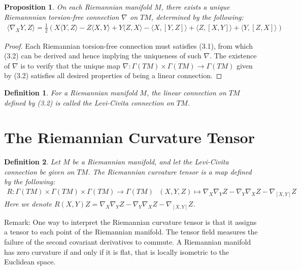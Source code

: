\documentclass[11pt]{book}
\theoremstyle{break}
\theoremstyle{break}
\newtheorem{prop}[lem]{Proposition}
\newtheorem{defn}{Definition}[corL]
\newcommand{\remark}{\color{blue}Remark: \color{black}}
\begin{document}
\begin{prop}
On each Riemannian manifold $M$, there exists a unique Riemannnian torsion-free connection $\nabla$ on $TM$, determined by the following:
\begin{align}
\langle \nabla_X Y,Z \rangle = \frac{1}{2}\left( X\langle Y,Z\rangle - Z\langle X,Y\rangle + Y \langle Z, X\rangle - \langle X,[Y,Z]\rangle + \langle Z, [X,Y]\rangle + \langle Y, [Z,X]\rangle\right)
\end{align}
\end{prop}
\begin{proof}
Each Riemannian torsion-free connection must satisfies (3.1), from which  (3.2) can be derived and hence implying the uniqueness of such $\nabla$. The existence of $\nabla$ is to verify that the unique map $\nabla:\Gamma(TM) \times \Gamma(TM) \to \Gamma(TM)$ given by (3.2) satisfies all desired properties of being a linear connection.
\end{proof}

\begin{defn}
For a Riemannian manifold $M$, the linear connection on $TM$ defined by (3.2) is called the Levi-Civita connection on $TM$. 
\end{defn}


\newpage
\section[The Riemannian Curvature Tensor]{\color{red} The Riemannian Curvature Tensor\color{black}}
\begin{defn}
Let $M$ be a Riemannian manifold, and let the Levi-Civita connection be given on $TM$. The Riemannian curvature tensor is a map defined by the following:
\begin{align*}
R:\Gamma(TM) \times \Gamma(TM) \times \Gamma(TM) \to \Gamma(TM) \ \ \ (X,Y,Z) \mapsto \nabla_X\nabla_Y Z - \nabla_Y\nabla_X Z - \nabla_{[X,Y]}Z
\end{align*}
Here we denote $R(X,Y)Z = \nabla_X\nabla_Y Z - \nabla_Y\nabla_X Z - \nabla_{[X,Y]}Z$. 
\end{defn}

\remark One way to interpret the Riemannian curvature tensor is that it assigns a tensor to each point of the Riemannian manifold. The tensor field measures the failure of the second covariant derivatives to commute. A Riemannian manifold has zero curvature if and only if it is flat, that is locally isometric to the Euclidean space.\\
\end{document}
